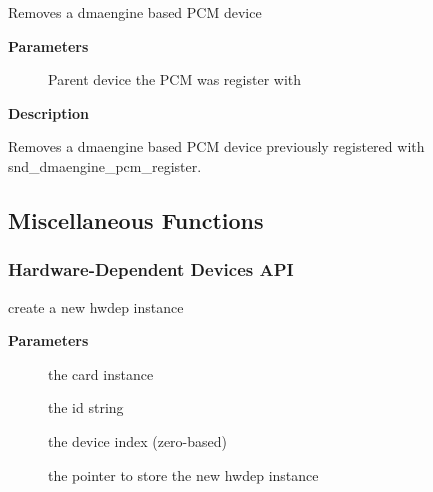 \documentclass[a4paper,8pt,english]{sphinxmanual}
\begin{document}
\begin{fulllineitems}
\label{sound/kernel-api/alsa-driver-api:c.snd_dmaengine_pcm_unregister}
Removes a dmaengine based PCM device

\end{fulllineitems}


\textbf{Parameters}
\begin{description}
\item[{}] \leavevmode
Parent device the PCM was register with

\end{description}

\textbf{Description}

Removes a dmaengine based PCM device previously registered with
snd\_dmaengine\_pcm\_register.


\subsection{Miscellaneous Functions}
\label{sound/kernel-api/alsa-driver-api:miscellaneous-functions}

\subsubsection{Hardware-Dependent Devices API}
\label{sound/kernel-api/alsa-driver-api:hardware-dependent-devices-api}

\begin{fulllineitems}
\label{sound/kernel-api/alsa-driver-api:c.snd_hwdep_new}
create a new hwdep instance

\end{fulllineitems}


\textbf{Parameters}
\begin{description}
\item[{}] \leavevmode
the card instance

\item[{}] \leavevmode
the id string

\item[{}] \leavevmode
the device index (zero-based)

\item[{}] \leavevmode
the pointer to store the new hwdep instance

\end{description}
\end{document}
